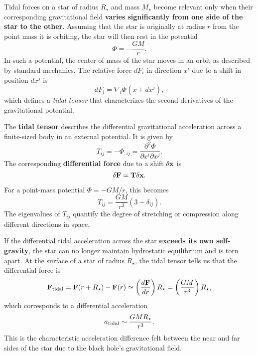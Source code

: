 Tidal forces on a star of radius $R_\star$ and mass $M_\star$ become relevant only when their corresponding gravitational field \textbf{varies significantly from one side of the star to the other}. Assuming that the star is originally at radius $r$ from the point mass it is orbiting, the star will then rest in the potential
\[
\Phi = -\frac{GM}{r}.
\]
In such a potential, the center of mass of the star moves in an orbit as described by standard mechanics. The relative force $dF_i$ in direction $x^i$ due to a shift in position $dx^j$ is 
\[
dF_i = \nabla_i \Phi(x + dx^j),
\]
which defines a \emph{tidal tensor} that characterizes the second derivatives of the gravitational potential.
\vspace{10pt}
\begin{definition}
The \textbf{tidal tensor} describes the differential gravitational acceleration across a finite-sized body in an external potential. It is given by
\begin{equation}
    \label{eq:tidal_tensor}
    \boxed{
    T_{ij} = -\Phi_{;ij} = \frac{\partial^2 \Phi}{\partial x^i\partial x^j}.
    }
\end{equation}
The corresponding \textbf{differential force} due to a shift $\delta {\bf x}$ is 
\[
\delta {\bf F} = \bf{T} \delta {\bf x}.
\]
\par
For a point-mass potential $\Phi = -GM/r$, this becomes
\[
T_{ij} = \frac{GM}{r^3}\left(3 - \delta_{ij}\right).
\]
The eigenvalues of $T_{ij}$ quantify the degree of stretching or compression along different directions in space.
\end{definition}
\vspace{10pt}
If the differential tidal acceleration across the star \textbf{exceeds its own self-gravity}, the star can no longer maintain hydrostatic equilibrium and is torn apart. At the surface of a star of radius $R_\star$, the tidal tensor tells us that the differential force is
\[
{\bf F}_{\rm tidal} = {\bf F}(r + R_\star) - {\bf F}(r) 
\simeq \left(\frac{d{\bf F}}{dr}\right) R_\star
= \left(\frac{GM}{r^3}\right) R_\star,
\]
which corresponds to a differential acceleration
\[
a_{\rm tidal} \sim \frac{GM R_\star}{r^3}.
\]
This is the characteristic acceleration difference felt between the near and far sides of the star due to the black hole’s gravitational field.

